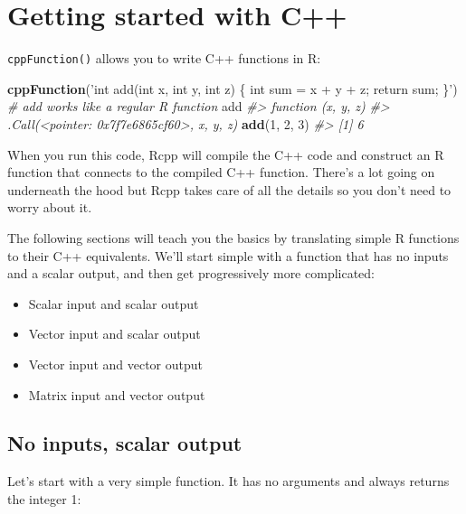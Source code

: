\documentclass[]{book}
\makeatletter
\newenvironment{Shaded}{\begin{snugshade}}{\end{snugshade}}
\newcommand{\CommentTok}[1]{\textcolor[rgb]{0.37,0.37,0.37}{\textit{#1}}}
\newcommand{\DecValTok}[1]{\textcolor[rgb]{0.06,0.06,0.06}{#1}}
\newcommand{\KeywordTok}[1]{\textcolor[rgb]{0.27,0.27,0.27}{\textbf{#1}}}
\newcommand{\NormalTok}[1]{#1}
\newcommand{\StringTok}[1]{\textcolor[rgb]{0.5,0.5,0.5}{#1}}
\providecommand{\tightlist}{%
  \setlength{\itemsep}{0pt}\setlength{\parskip}{0pt}}
\newcommand{\indexc}[1]{\index{#1@\texttt{#1}}}
\makeatother
\begin{document}
\hypertarget{rcpp-intro}{%
\section{Getting started with C++}\label{rcpp-intro}}

\texttt{cppFunction()} allows you to write C++ functions in R: \indexc{cppFunction()}

\begin{Shaded}
\begin{Highlighting}[]
\KeywordTok{cppFunction}\NormalTok{(}\StringTok{'int add(int x, int y, int z) \{}
\StringTok{  int sum = x + y + z;}
\StringTok{  return sum;}
\StringTok{\}'}\NormalTok{)}
\CommentTok{# add works like a regular R function}
\NormalTok{add}
\CommentTok{#> function (x, y, z) }
\CommentTok{#> .Call(<pointer: 0x7f7e6865cf60>, x, y, z)}
\KeywordTok{add}\NormalTok{(}\DecValTok{1}\NormalTok{, }\DecValTok{2}\NormalTok{, }\DecValTok{3}\NormalTok{)}
\CommentTok{#> [1] 6}
\end{Highlighting}
\end{Shaded}

When you run this code, Rcpp will compile the C++ code and construct an R function that connects to the compiled C++ function. There's a lot going on underneath the hood but Rcpp takes care of all the details so you don't need to worry about it.

The following sections will teach you the basics by translating simple R functions to their C++ equivalents. We'll start simple with a function that has no inputs and a scalar output, and then get progressively more complicated:

\begin{itemize}
\tightlist
\item
  Scalar input and scalar output
\item
  Vector input and scalar output
\item
  Vector input and vector output
\item
  Matrix input and vector output
\end{itemize}

\hypertarget{no-inputs-scalar-output}{%
\subsection{No inputs, scalar output}\label{no-inputs-scalar-output}}

Let's start with a very simple function. It has no arguments and always returns the integer 1:
\end{document}

